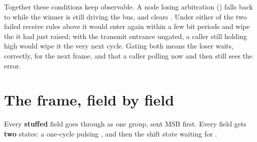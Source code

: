 Together these conditions keep  observable. A node losing arbitration ()
falls back to  while the winner is still driving the bus, and 
clears . Under either of the two failed receive rules above it would enter
 again within a few bit periods and wipe the  it had just raised; with
the transmit entrance ungated, a caller still holding  high would wipe it the very next
cycle. Gating both means the loser waits, correctly, for the next frame, and that a caller polling
 now and then still sees the error.

\section{The frame, field by field}
\label{c16:sec:fields}


Every \textbf{stuffed} field goes through  as one group, sent MSB first. Every
field gets \textbf{two} states: a one-cycle  pulsing , and
then the shift state waiting for .

